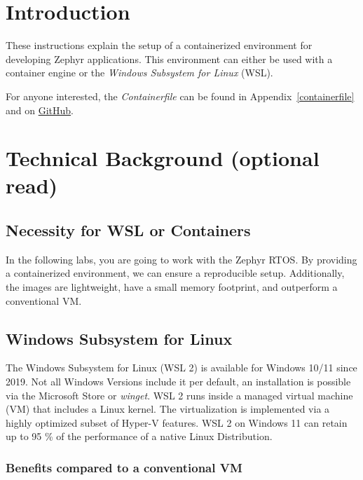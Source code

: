 



\puttitle{}

\section{Introduction}

These instructions explain the setup of a containerized environment for developing Zephyr applications.
This environment can either be used with a container engine or the \emph{Windows Subsystem for Linux} (WSL).

For anyone interested, the \emph{Containerfile} can be found in Appendix~\ref{containerfile}
and on \href{https://github.com/InES-IoT/zephyr_development_environment_container}{GitHub}.



\section{Technical Background (optional read)}

\subsection{Necessity for WSL or Containers}

In the following labs, you are going to work with the Zephyr RTOS.
By providing a containerized environment, we can ensure a reproducible setup.
Additionally, the images are lightweight, have a small memory footprint, and outperform a conventional VM.

\subsection{Windows Subsystem for Linux}

The Windows Subsystem for Linux (WSL 2) is available for Windows 10/11 since 2019.
Not all Windows Versions include it per default, an installation is possible via the Microsoft Store or \emph{winget}.
WSL 2 runs inside a managed virtual machine (VM) that includes a Linux kernel.
The virtualization is implemented via a highly optimized subset of Hyper-V features.
WSL 2 on Windows 11 can retain up to 95 \% of the performance of a native Linux Distribution.

\subsubsection*{Benefits compared to a conventional VM}

